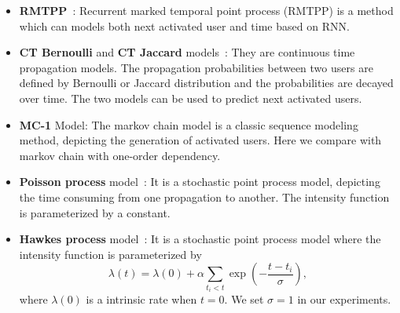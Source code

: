 \begin{itemize}
  \item \textbf{RMTPP}~\cite{DuKDD2016}: Recurrent marked temporal point process
  (RMTPP) is a method which can models both next activated user and time based on RNN.
  \item \textbf{CT Bernoulli} and \textbf{CT Jaccard}
  models~\cite{goyal2010learning}: They are continuous time propagation models.
  The propagation probabilities between two users are defined by Bernoulli or
  Jaccard distribution and the probabilities are decayed over time. The two
  models can be used to predict next activated users.
  \item \textbf{MC-1} Model: The markov chain model is a classic sequence
  modeling method, depicting the generation of activated users. Here
  we compare with markov chain with one-order dependency.
  \item \textbf{Poisson process} model~\cite{vere1988introduction}: It is a
  stochastic point process model, depicting the time consuming from one
  propagation to another. The intensity function is parameterized by a constant.
  \item \textbf{Hawkes process} model~\cite{hawkes1971spectra}: It is a
  stochastic point process model where the intensity function is parameterized by
  \begin{equation} 
  \label{eq:hawke_intens_func}
  \lambda(t)=\lambda(0)+\alpha\sum_{t_i<t}\exp\left(-\frac{t-t_i}{\sigma}\right),
  \end{equation}
   where $\lambda(0)$ is a intrinsic rate when $t=0$. We set $\sigma=1$ in our
   experiments.
\end{itemize}


